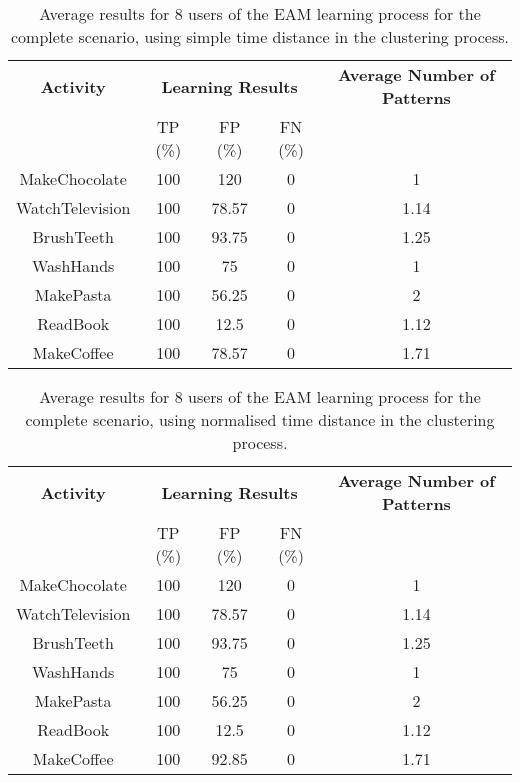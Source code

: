 \begin{table}[htbp]\scriptsize
  \begin{center}
        \begin{tabular}{ccccc}
            \hline            
            \textbf{Activity} & \multicolumn{3}{c}{\textbf{Learning Results}} & \textbf{Average Number of Patterns} \\
             & TP (\%) & FP (\%) & FN (\%) & \\             
            \hline
            MakeChocolate   & 100 & 120   & 0 & 1 \\
	    WatchTelevision & 100 & 78.57 & 0 & 1.14 \\
	    BrushTeeth      & 100 & 93.75 & 0 & 1.25 \\
	    WashHands       & 100 & 75    & 0 & 1 \\
	    MakePasta       & 100 & 56.25 & 0 & 2 \\
	    ReadBook        & 100 & 12.5  & 0 & 1.12 \\
	    MakeCoffee      & 100 & 78.57   & 0 & 1.71 \\
            \hline
        \end{tabular}                
        \caption{Average results for 8 users of the EAM learning process for the complete scenario, using simple time distance in the clustering process.}
        \label{tab-rp-comp-t0}
    \end{center}
\end{table}

\begin{table}[htbp]\scriptsize
  \begin{center}
        \begin{tabular}{ccccc}
            \hline            
            \textbf{Activity} & \multicolumn{3}{c}{\textbf{Learning Results}} & \textbf{Average Number of Patterns} \\
             & TP (\%) & FP (\%) & FN (\%) & \\             
            \hline
            MakeChocolate   & 100 & 120   & 0 & 1 \\
	    WatchTelevision & 100 & 78.57 & 0 & 1.14 \\
	    BrushTeeth      & 100 & 93.75 & 0 & 1.25 \\
	    WashHands       & 100 & 75    & 0 & 1 \\
	    MakePasta       & 100 & 56.25 & 0 & 2 \\
	    ReadBook        & 100 & 12.5  & 0 & 1.12 \\
	    MakeCoffee      & 100 & 92.85   & 0 & 1.71 \\
            \hline
        \end{tabular}                
        \caption{Average results for 8 users of the EAM learning process for the complete scenario, using normalised time distance in the clustering process.}
        \label{tab-rp-comp-t1}
    \end{center}
\end{table}



